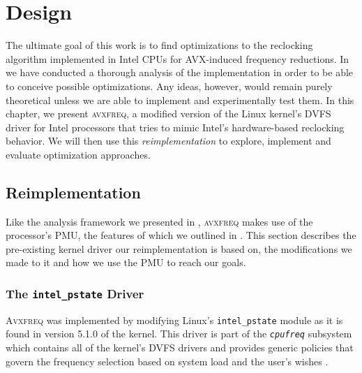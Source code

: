 \chapter{Design}
\label{sec:design}

The ultimate goal of this work is to find optimizations to the reclocking algorithm implemented in Intel \glspl{CPU} for \gls{AVX}-induced frequency reductions. In  we have conducted a thorough analysis of the implementation in order to be able to conceive possible optimizations. Any ideas, however, would remain purely theoretical unless we are able to implement and experimentally test them. In this chapter, we present \textsc{avxfreq}, a modified version of the Linux kernel's \gls{DVFS} driver for Intel processors that tries to mimic Intel's hardware-based reclocking behavior. We will then use this \emph{reimplementation} to explore, implement and evaluate optimization approaches.

\section{Reimplementation}
\label{sec:design:reimplementation}

Like the analysis framework we presented in , \textsc{avxfreq} makes use of the processor's \gls{PMU}, the features of which we outlined in . This section describes the pre-existing kernel driver our reimplementation is based on, the modifications we made to it and how we use the \gls{PMU} to reach our goals.

\subsection{The \texttt{intel\_pstate} Driver}
\label{sec:design:reimplementation:intel_pstate}

\textsc{Avxfreq} was implemented by modifying Linux's \texttt{intel\_pstate} module as it is found in version 5.1.0 of the kernel. This driver is part of the \textit{\texttt{cpufreq}} subsystem which contains all of the kernel's \gls{DVFS} drivers and provides generic policies that govern the frequency selection based on system load and the user's wishes \cite{cpufreq}. %

